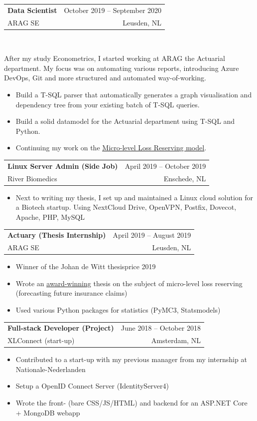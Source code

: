 \documentclass[A4,11pt]{article}
\makeatletter
\newcommand{\CVItem}[1]{
  \item\small{
    {#1 \vspace{-2pt}}
  }
}
\newcommand{\CVSubheading}[4]{
  \vspace{-2pt}\item
    \begin{tabular*}{0.97\textwidth}[t]{l@{\extracolsep{\fill}}r}
      \textbf{#1} & #2 \\
      \small#3 & \small #4 \\
    \end{tabular*}\vspace{-7pt}
}
\newcommand{\CVItemListStart}{\begin{itemize}}
\newcommand{\CVItemListEnd}{\end{itemize}\vspace{-5pt}}
\makeatother
\begin{document}
    \CVSubheading
      {Data Scientist}{October 2019 -- September 2020}
      {ARAG SE}{Leusden, NL} \\ \vspace{14pt}
      
      After my study Econometrics, I started working at ARAG the Actuarial department. My focus was on automating various reports, introducing Azure DevOps, Git and more structured and automated way-of-working.
      
      \CVItemListStart
        \CVItem{Build a T-SQL parser that automatically generates a graph visualisation and dependency tree from your existing batch of T-SQL queries.}
        \CVItem{Build a solid datamodel for the Actuarial department using T-SQL and Python.}
        \CVItem{Continuing my work on the \href{https://www.ag-ai.nl/view/43430-thesis.pdf}{\underline{Micro-level Loss Reserving model}}.}
      \CVItemListEnd
      
    \CVSubheading
      {Linux Server Admin (Side Job)}{April 2019 -- October 2019}
      {River Biomedics}{Enschede, NL}
      \CVItemListStart
        \CVItem{Next to writing my thesis, I set up and maintained a Linux cloud solution for a Biotech startup. Using NextCloud Drive, OpenVPN, Postfix, Dovecot, Apache, PHP, MySQL}
      \CVItemListEnd

    \CVSubheading
      {Actuary (Thesis Internship)}{April 2019 -- August 2019}
      {ARAG SE}{Leusden, NL}
      \CVItemListStart
        \CVItem{Winner of the Johan de Witt thesisprice 2019}
        \CVItem{Wrote an \href{https://www.actuaris.info/nieuws/actuarieel/johan-de-witt-prijzen-2019/35429}{\underline{award-winning}} thesis on the subject of micro-level loss reserving (forecasting future insurance claims)}
        \CVItem{Used various Python packages for statistics (PyMC3, Statsmodels)}
     \CVItemListEnd
     
    \CVSubheading
      {Full-stack Developer (Project)}{June 2018 -- October 2018}
      {XLConnect (start-up)}{Amsterdam, NL}
      \CVItemListStart
        \CVItem{Contributed to a start-up with my previous manager from my internship at Nationale-Nederlanden}
        \CVItem{Setup a OpenID Connect Server (IdentityServer4)}
        \CVItem{Wrote the front- (bare CSS/JS/HTML) and backend for an ASP.NET Core + MongoDB webapp}
     \CVItemListEnd
      
\end{document}
